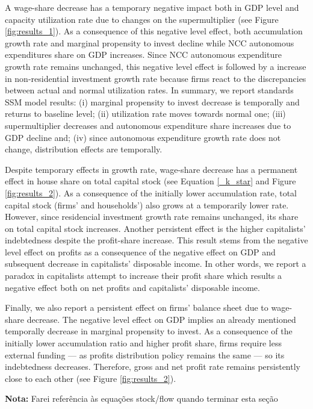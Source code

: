 \documentclass[11pt]{article}
\begin{document}
A wage-share decrease has a temporary negative impact both in GDP level and capacity utilization rate due to changes on the supermultiplier (see Figure \ref{fig:results_1}).
As a consequence of this negative level effect, both accumulation growth rate and marginal propensity to invest decline while NCC autonomous expenditures share on GDP increases.
Since NCC autonomous expenditure growth rate remains unchanged, this negative level effect is followed by a increase in non-residential investment growth rate because firms react to the discrepancies between actual and normal utilization rates.
In summary, we report standards SSM model results:
    (i) marginal propensity to invest decrease is temporally and returns to baseline level;
    (ii) utilization rate moves towards normal one;
    (iii) supermultiplier decreases and autonomous expenditure share increases due to GDP decline and; 
    (iv) since autonomous expenditure growth rate does not change, distribution effects are temporally.

Despite temporary effects in growth rate, wage-share decrease has a permanent effect in house share on total capital stock (see Equation \ref{_k_star} and Figure \ref{fig:results_2}).
As a consequence of the initially lower accumulation rate, total capital stock (firms' and households') also grows at a temporarily lower rate.
However, since residencial investment growth rate remains unchanged, its share on total capital stock increases.
Another persistent effect is the higher capitalists' indebtedness despite the profit-share increase.
This result stems from the negative level effect on profits as a consequence of the negative effect on GDP and subsequent decrease in capitalists' disposable income.
In other words, we report a paradox in capitalists attempt to increase their profit share which results a negative effect both on net profits and capitalists' disposable income.

Finally, we also report a persistent effect on firms' balance sheet due to wage-share decrease.
The negative level effect on GDP implies an already mentioned temporally decrease in marginal propensity to invest.
As a consequence of the initially lower accumulation ratio and higher profit share, firms require less external funding --- as profits distribution policy remains the same  --- so its indebtedness decreases.
Therefore, gross and net profit rate remains persistently close to each other (see Figure \ref{fig:results_2}).

\textbf{Nota:} Farei referência às equações stock/flow quando terminar esta seção
\end{document}

